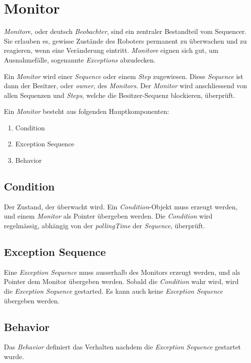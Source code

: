 \section{Monitor}
\label{Monitor}
\textit{Monitore}, oder deutsch \textit{Beobachter}, sind ein zentraler Bestandteil vom Sequencer.
Sie erlauben es, gewisse Zustände des Roboters permanent zu überwachen und zu reagieren, wenn eine Veränderung eintritt.
\textit{Monitore} eignen sich gut, um Ausnahmefälle, sogenannte \textit{Exceptions} abzudecken.

Ein \textit{Monitor} wird einer \textit{Sequence} oder einem \textit{Step} zugewiesen.
Diese \textit{Sequence} ist dann der Besitzer, oder \textit{owner}, des \textit{Monitors}.
Der \textit{Monitor} wird anschliessend von allen Sequenzen und \textit{Steps}, welche die Besitzer-Sequenz blockieren, überprüft.

Ein \textit{Monitor} besteht aus folgenden Hauptkomponenten:
\begin{enumerate}
\item Condition 
\item Exception Sequence
\item Behavior
\end{enumerate}

\subsection{Condition}
Der Zustand, der überwacht wird.
Ein \textit{Condition}-Objekt muss erzeugt werden, und einem \textit{Monitor} als Pointer übergeben werden.
Die \textit{Condition} wird regelmässig, abhängig von der \textit{pollingTime} der \textit{Sequence}, überprüft.


\subsection{Exception Sequence}
Eine \textit{Exception Sequence} muss ausserhalb des Monitors erzeugt werden, und als Pointer dem Monitor übergeben werden.
Sobald die \textit{Condition} wahr wird, wird die \textit{Exception Sequence} gestarted.
Es kann auch keine \textit{Exception Sequence} übergeben werden.

\subsection{Behavior}
Das \textit{Behavior} definiert das Verhalten nachdem die \textit{Exception Sequence} gestartet wurde.

